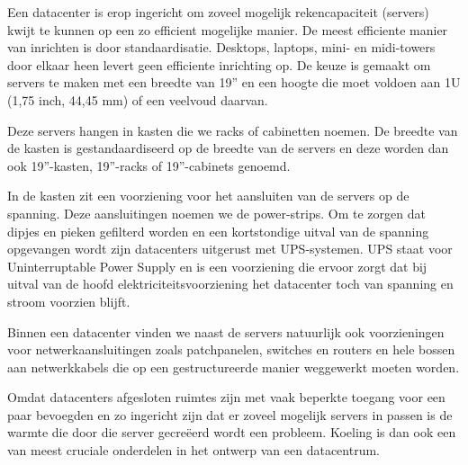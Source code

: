 Een datacenter is erop ingericht om zoveel mogelijk rekencapaciteit (servers) kwijt te kunnen op een zo efficient mogelijke manier. De meest efficiente manier van inrichten is door standaardisatie. Desktops, laptops, mini- en midi-towers door elkaar heen levert geen efficiente inrichting op. De keuze is gemaakt om servers te maken met een breedte van 19'' en een hoogte die moet voldoen aan 1U (1,75 inch, 44,45 mm) of een veelvoud daarvan.

Deze servers hangen in kasten die we racks of cabinetten noemen. De breedte van de kasten is gestandaardiseerd op de breedte van de servers en deze worden dan ook 19''-kasten, 19''-racks of 19''-cabinets genoemd.

In de kasten zit een voorziening voor het aansluiten van de servers op de spanning. Deze aansluitingen noemen we de power-strips. Om te zorgen dat dipjes en pieken gefilterd worden en een kortstondige uitval van de spanning opgevangen wordt zijn datacenters uitgerust met UPS-systemen. UPS staat voor Uninterruptable Power Supply en is een voorziening die ervoor zorgt dat bij uitval van de hoofd elektriciteitsvoorziening het datacenter toch van spanning en stroom voorzien blijft.

Binnen een datacenter vinden we naast de servers natuurlijk ook voorzieningen voor netwerkaansluitingen zoals patchpanelen, switches en routers en hele bossen aan netwerkkabels die op een gestructureerde manier weggewerkt moeten worden.

Omdat datacenters afgesloten ruimtes zijn met vaak beperkte toegang voor een paar bevoegden en zo ingericht zijn dat er zoveel mogelijk servers in passen is de warmte die door die server gecre\"eerd wordt een probleem. Koeling is dan ook een van meest cruciale onderdelen in het ontwerp van een datacentrum.
